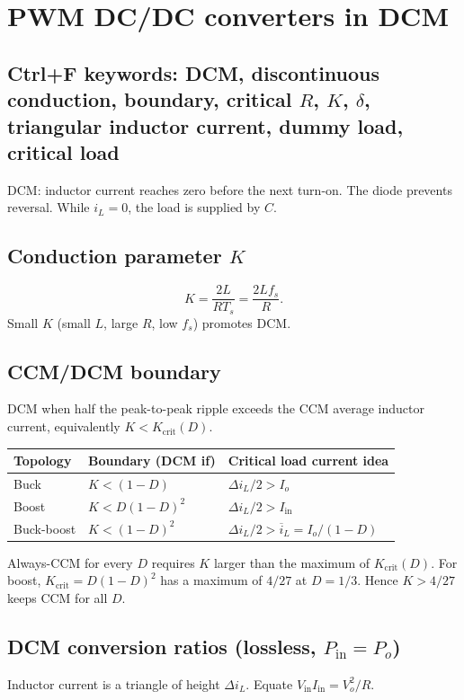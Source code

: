 \section{PWM DC/DC converters in DCM}

\subsection{Ctrl+F keywords: DCM, discontinuous conduction, boundary, critical \(R\), \(K\), \(\delta\), triangular inductor current, dummy load, critical load}

DCM: inductor current reaches zero before the next turn-on. The diode prevents reversal. While \(i_L=0\), the load is supplied by \(C\).

\subsection{Conduction parameter \(K\)}
\[
K=\frac{2L}{R T_s}=\frac{2L f_s}{R}.
\]
Small \(K\) (small \(L\), large \(R\), low \(f_s\)) promotes DCM.

\subsection{CCM/DCM boundary}
DCM when half the peak-to-peak ripple exceeds the CCM average inductor current, equivalently \(K<K_{\mathrm{crit}}(D)\).

\begin{center}
\begin{tabular}{@{}lll@{}}
\toprule
Topology & Boundary (DCM if) & Critical load current idea\\
\midrule
Buck & \(K<(1-D)\) & \(\Delta i_L/2>I_o\)\\
Boost & \(K<D(1-D)^2\) & \(\Delta i_L/2>I_{\mathrm{in}}\)\\
Buck-boost & \(K<(1-D)^2\) & \(\Delta i_L/2>\overline{i}_L=I_o/(1-D)\)\\
\bottomrule
\end{tabular}
\end{center}
Always-CCM for every \(D\) requires \(K\) larger than the maximum of \(K_{\mathrm{crit}}(D)\).
For boost, \(K_{\mathrm{crit}}=D(1-D)^2\) has a maximum of \(4/27\) at \(D=1/3\). Hence \(K>4/27\) keeps CCM for all \(D\).

\subsection{DCM conversion ratios (lossless, \(P_{\mathrm{in}}=P_o\))}
Inductor current is a triangle of height \(\Delta i_L\). Equate \(V_{\mathrm{in}}I_{\mathrm{in}}=V_o^2/R\).

